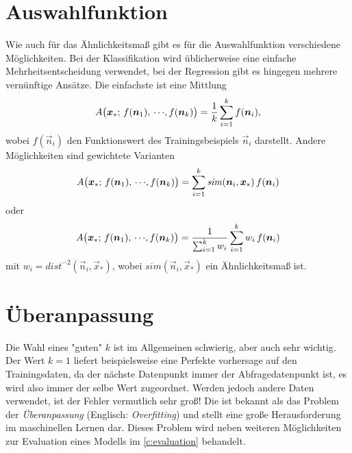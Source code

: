 	\section{Auswahlfunktion}
		Wie auch für das Ähnlichkeitsmaß gibt es für die Auswahlfunktion verschiedene Möglichkeiten. Bei der Klassifikation wird üblicherweise eine einfache Mehrheitsentscheidung verwendet, bei der Regression gibt es hingegen mehrere vernünftige Ansätze. Die einfachste ist eine Mittlung
		\begin{equation}
			A\big( \bm{x}_\ast;\, f(\bm{n}_1),\,\cdots\!,f(\bm{n}_k) \big) = \frac{1}{k} \sum_{i = 1}^{k} f(\bm{n}_i),
		\end{equation}
		wobei \( f(\vec{n}_i) \) den Funktionswert des Trainingsbeispiels \( \vec{n}_i \) darstellt. Andere Möglichkeiten sind gewichtete Varianten
		\begin{equation}
			A\big( \bm{x}_\ast;\, f(\bm{n}_1),\,\cdots\!,f(\bm{n}_k) \big) = \sum_{i = 1}^{k} \mathit{sim}(\bm{n}_i, \bm{x}_\ast) \, f(\bm{n}_i)
		\end{equation}
		oder
		\begin{equation}
			A\big( \bm{x}_\ast;\, f(\bm{n}_1),\,\cdots\!,f(\bm{n}_k) \big) = \frac{1}{\sum_{i = 1}^{k} w_i} \sum_{i = 1}^{k} w_i \, f(\bm{n}_i)
		\end{equation}
		mit \( w_i = \mathit{dist}^{-2}(\vec{n}_i, \vec{x}_\ast) \), wobei \( \mathit{sim}(\vec{n}_i, \vec{x}_\ast) \) ein Ähnlichkeitsmaß ist.

	\section{Überanpassung}
		Die Wahl eines "guten" \(k\) ist im Allgemeinen schwierig, aber auch sehr wichtig. Der Wert \( k = 1 \) liefert beispielsweise eine Perfekte vorhersage auf den Trainingsdaten, da der nächste Datenpunkt immer der Abfragedatenpunkt ist, es wird also immer der selbe Wert zugeordnet. Werden jedoch andere Daten verwendet, ist der Fehler vermutlich sehr groß! Die ist bekannt als das Problem der \emph{Überanpassung} (Englisch: \emph{Overfitting}) und stellt eine große Herausforderung im maschinellen Lernen dar. Dieses Problem wird neben weiteren Möglichkeiten zur Evaluation eines Modells im \autoref{c:evaluation} behandelt.

